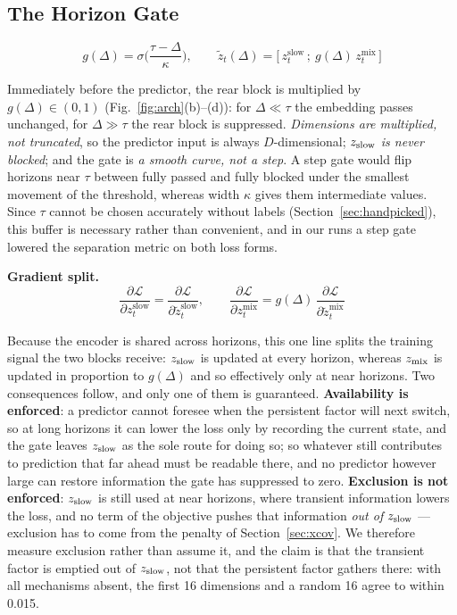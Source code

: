 \subsection{The Horizon Gate}

\begin{equation}
g(\Delta) = \sigma\!\Big(\frac{\tau-\Delta}{\kappa}\Big), \qquad \tilde z_t(\Delta) = \big[\,z_t^{\mathrm{slow}}\,;\ g(\Delta)\,z_t^{\mathrm{mix}}\,\big]
\label{eq:gate}
\end{equation}

Immediately before the predictor, the rear block is multiplied by $g(\Delta)\in(0,1)$ (Fig.~\ref{fig:arch}(b)--(d)): for $\Delta\ll\tau$ the embedding passes unchanged, for $\Delta\gg\tau$ the rear block is suppressed. \emph{Dimensions are multiplied, not truncated}, so the predictor input is always $D$-dimensional; \emph{$z_{\mathrm{slow}}$ is never blocked}; and the gate is \emph{a smooth curve, not a step}. A step gate would flip horizons near $\tau$ between fully passed and fully blocked under the smallest movement of the threshold, whereas width $\kappa$ gives them intermediate values. Since $\tau$ cannot be chosen accurately without labels (Section~\ref{sec:handpicked}), this buffer is necessary rather than convenient, and in our runs a step gate lowered the separation metric on both loss forms.

\textbf{Gradient split.}
\begin{equation}
\frac{\partial\mathcal{L}}{\partial z_t^{\mathrm{slow}}} = \frac{\partial\mathcal{L}}{\partial \tilde z_t^{\mathrm{slow}}}, \qquad \frac{\partial\mathcal{L}}{\partial z_t^{\mathrm{mix}}} = g(\Delta)\,\frac{\partial\mathcal{L}}{\partial \tilde z_t^{\mathrm{mix}}}
\label{eq:grad}
\end{equation}

Because the encoder is shared across horizons, this one line splits the training signal the two blocks receive: $z_{\mathrm{slow}}$ is updated at every horizon, whereas $z_{\mathrm{mix}}$ is updated in proportion to $g(\Delta)$ and so effectively only at near horizons. Two consequences follow, and only one of them is guaranteed. \textbf{Availability is enforced}: a predictor cannot foresee when the persistent factor will next switch, so at long horizons it can lower the loss only by recording the current state, and the gate leaves $z_{\mathrm{slow}}$ as the sole route for doing so; so whatever still contributes to prediction that far ahead must be readable there, and no predictor however large can restore information the gate has suppressed to zero. \textbf{Exclusion is not enforced}: $z_{\mathrm{slow}}$ is still used at near horizons, where transient information lowers the loss, and no term of the objective pushes that information \emph{out of} $z_{\mathrm{slow}}$ --- exclusion has to come from the penalty of Section~\ref{sec:xcov}. We therefore measure exclusion rather than assume it, and the claim is that the transient factor is emptied out of $z_{\mathrm{slow}}$, not that the persistent factor gathers there: with all mechanisms absent, the first 16 dimensions and a random 16 agree to within 0.015.

